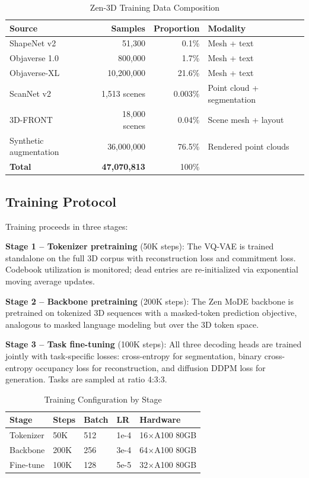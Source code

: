 \documentclass[11pt,a4paper]{article}
\begin{document}
\begin{table}[H]
\centering
\begin{tabular}{lrrl}
\toprule
\textbf{Source} & \textbf{Samples} & \textbf{Proportion} & \textbf{Modality} \\
\midrule
ShapeNet v2 & 51,300 & 0.1\% & Mesh + text \\
Objaverse 1.0 & 800,000 & 1.7\% & Mesh + text \\
Objaverse-XL & 10,200,000 & 21.6\% & Mesh + text \\
ScanNet v2 & 1,513 scenes & 0.003\% & Point cloud + segmentation \\
3D-FRONT & 18,000 scenes & 0.04\% & Scene mesh + layout \\
Synthetic augmentation & 36,000,000 & 76.5\% & Rendered point clouds \\
\midrule
\textbf{Total} & \textbf{47,070,813} & 100\% & \\
\bottomrule
\end{tabular}
\caption{Zen-3D Training Data Composition}
\end{table}

\subsection{Training Protocol}

Training proceeds in three stages:

\textbf{Stage 1 -- Tokenizer pretraining} (50K steps): The VQ-VAE is trained standalone on the
full 3D corpus with reconstruction loss and commitment loss. Codebook utilization is monitored;
dead entries are re-initialized via exponential moving average updates.

\textbf{Stage 2 -- Backbone pretraining} (200K steps): The Zen MoDE backbone is pretrained on
tokenized 3D sequences with a masked-token prediction objective, analogous to masked language
modeling but over the 3D token space.

\textbf{Stage 3 -- Task fine-tuning} (100K steps): All three decoding heads are trained jointly
with task-specific losses: cross-entropy for segmentation, binary cross-entropy occupancy loss for
reconstruction, and diffusion DDPM loss for generation. Tasks are sampled at ratio 4:3:3.

\begin{table}[H]
\centering
\begin{tabular}{lllll}
\toprule
\textbf{Stage} & \textbf{Steps} & \textbf{Batch} & \textbf{LR} & \textbf{Hardware} \\
\midrule
Tokenizer & 50K & 512 & 1e-4 & 16$\times$A100 80GB \\
Backbone & 200K & 256 & 3e-4 & 64$\times$A100 80GB \\
Fine-tune & 100K & 128 & 5e-5 & 32$\times$A100 80GB \\
\bottomrule
\end{tabular}
\caption{Training Configuration by Stage}
\end{table}
\end{document}
